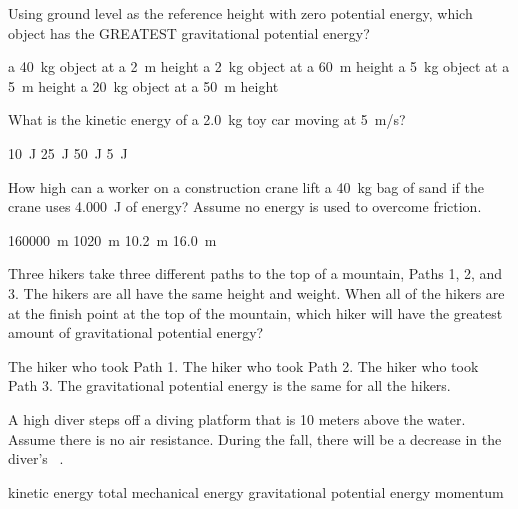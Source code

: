 \documentclass[../main-physics-problems.tex]{subfiles}
\begin{document}
\begin{questions}
\question
Using ground level as the reference height with zero potential energy, which object has the GREATEST gravitational potential energy?

\begin{randomizechoices}
\choice a \SI{40}{kg} object at a \SI{2}{m} height
\choice a \SI{2}{kg} object at a \SI{60}{m} height
\choice a \SI{5}{kg} object at a \SI{5}{m} height
\correctchoice a \SI{20}{kg} object at a \SI{50}{m} height
\end{randomizechoices}

\question
What is the kinetic energy of a \SI{2.0}{kg} toy car moving at \SI{5}{m/s}?

\begin{randomizechoices}
\choice \SI{10}{J}
\correctchoice \SI{25}{J}
\choice \SI{50}{J}
\choice \SI{5}{J}
\end{randomizechoices}

\question
How high can a worker on a construction crane lift a \SI{40}{kg} bag of sand if the crane uses \SI{4,000}{J} of energy? Assume no energy is used to overcome friction.

\begin{randomizechoices}
\choice \SI{160000}{m}
\choice \SI{1020}{m}
\correctchoice \SI{10.2}{m}
\choice \SI{16.0}{m}
\end{randomizechoices}

\question
Three hikers take three different paths to the top of a mountain, Paths 1, 2, and 3. The hikers are all have the same height and weight. When all of the hikers are at the finish point at the top of the mountain, which hiker will have the greatest amount of gravitational potential energy?

\begin{randomizechoices}
\choice The hiker who took Path 1. 
\choice The hiker who took Path 2.
\choice The hiker who took Path 3.
\choice The gravitational potential energy is the same for all the hikers.
\end{randomizechoices}

\question
A high diver steps off a diving platform that is 10 meters above the water. Assume there is no air resistance. During the fall, there will be a decrease in the diver's \fillin\ .

\begin{randomizechoices}
\choice kinetic energy
\choice total mechanical energy
\correctchoice gravitational potential energy
\choice momentum
\end{randomizechoices}



\end{questions}
\end{document}
